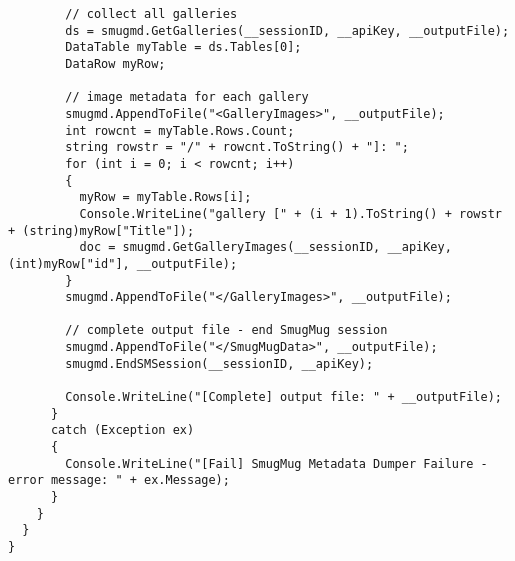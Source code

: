 \begin{lstlisting}
        // collect all galleries
        ds = smugmd.GetGalleries(__sessionID, __apiKey, __outputFile);
        DataTable myTable = ds.Tables[0];
        DataRow myRow;

        // image metadata for each gallery
        smugmd.AppendToFile("<GalleryImages>", __outputFile);
        int rowcnt = myTable.Rows.Count;
        string rowstr = "/" + rowcnt.ToString() + "]: ";
        for (int i = 0; i < rowcnt; i++)
        {
          myRow = myTable.Rows[i];
          Console.WriteLine("gallery [" + (i + 1).ToString() + rowstr + (string)myRow["Title"]);
          doc = smugmd.GetGalleryImages(__sessionID, __apiKey, (int)myRow["id"], __outputFile);
        }
        smugmd.AppendToFile("</GalleryImages>", __outputFile);

        // complete output file - end SmugMug session
        smugmd.AppendToFile("</SmugMugData>", __outputFile);
        smugmd.EndSMSession(__sessionID, __apiKey);

        Console.WriteLine("[Complete] output file: " + __outputFile);
      }
      catch (Exception ex)
      {
        Console.WriteLine("[Fail] SmugMug Metadata Dumper Failure - error message: " + ex.Message);
      }
    }
  }
}
\end{lstlisting}
\lstset{style=resetdefaults}

%